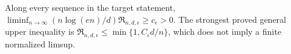 Along every sequence in the target statement, \(\liminf_{n\to\infty}(n\log(en)/d)\mathfrak R_{n,d,\epsilon}\geq c_\epsilon>0\).  The strongest proved general upper inequality is \(\mathfrak R_{n,d,\epsilon}\leq\min\{1,C_\epsilon d/n\}\), which does not imply a finite normalized limsup.